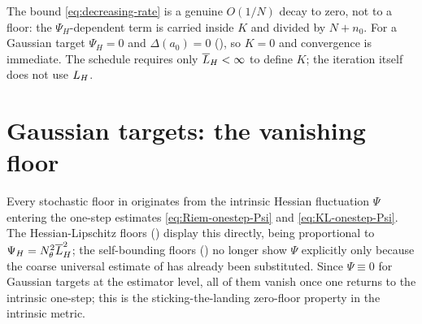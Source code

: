 \begin{remark}
\label{rem:decreasing-reading}
The bound \eqref{eq:decreasing-rate} is a genuine $O(1/N)$ decay to zero, not to a floor: the
$\Psi_H$-dependent term is carried inside $K$ and divided by $N+n_0$. For a Gaussian target
$\Psi_H=0$ and $\Delta(a_0)=0$ (), so $K=0$ and convergence is immediate.
The schedule requires only $\overline{L}_H<\infty$ to define $K$; the iteration itself does not use $L_H$.
\end{remark}

\section{Gaussian targets: the vanishing floor}
\label{sec:gauss-nofloor}

Every stochastic floor in  originates from the intrinsic Hessian
fluctuation $\Psi$ entering the one-step estimates \eqref{eq:Riem-onestep-Psi} and
\eqref{eq:KL-onestep-Psi}. The Hessian-Lipschitz floors
() display this directly, being proportional to
$\Psi_H=N_\theta^2\overline{L}_H^2$; the self-bounding floors ()
no longer show $\Psi$ explicitly only because the coarse universal estimate of
 has already been substituted. Since $\Psi\equiv0$ for Gaussian targets at
the estimator level, all of them vanish once one returns to the intrinsic one-step; this is the
sticking-the-landing zero-floor property in the intrinsic metric.

